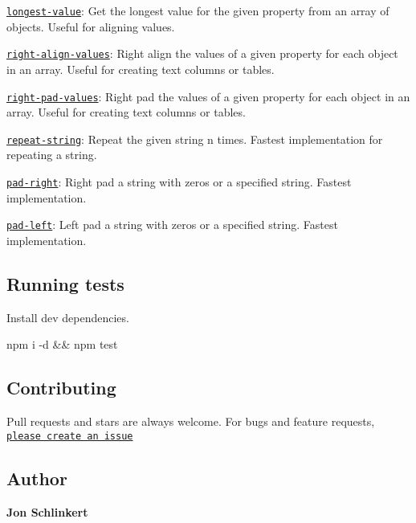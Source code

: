 \begin{DoxyItemize}
\item \href{https://github.com/jonschlinkert/longest-value}{\tt longest-\/value}\+: Get the longest value for the given property from an array of objects. Useful for aligning values.
\item \href{https://github.com/jonschlinkert/right-align-values}{\tt right-\/align-\/values}\+: Right align the values of a given property for each object in an array. Useful for creating text columns or tables.
\item \href{https://github.com/jonschlinkert/right-pad-values}{\tt right-\/pad-\/values}\+: Right pad the values of a given property for each object in an array. Useful for creating text columns or tables.
\item \href{https://github.com/jonschlinkert/repeat-string}{\tt repeat-\/string}\+: Repeat the given string n times. Fastest implementation for repeating a string.
\item \href{https://github.com/jonschlinkert/pad-right}{\tt pad-\/right}\+: Right pad a string with zeros or a specified string. Fastest implementation.
\item \href{https://github.com/jonschlinkert/pad-left}{\tt pad-\/left}\+: Left pad a string with zeros or a specified string. Fastest implementation.
\end{DoxyItemize}

\subsection*{Running tests}

Install dev dependencies.


\begin{DoxyCode}
npm i -d && npm test
\end{DoxyCode}


\subsection*{Contributing}

Pull requests and stars are always welcome. For bugs and feature requests, \href{https://github.com/jonschlinkert/longest/issues}{\tt please create an issue}

\subsection*{Author}

{\bfseries Jon Schlinkert}



